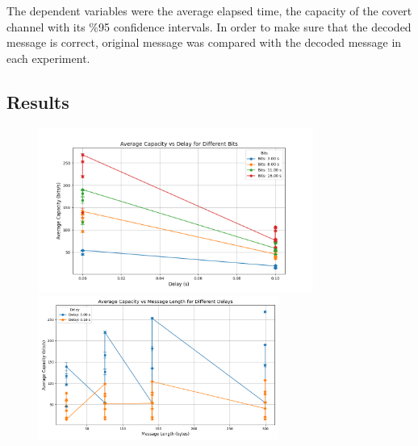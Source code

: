\documentclass[10pt,a4paper]{article}
\begin{document}
The dependent variables were the average elapsed time, the capacity of the covert channel with its \%95 confidence intervals.
In order to make sure that the decoded message is correct, original message was compared with the decoded message in each experiment. 


\subsection*{Results}
\vspace{-2em}
\begin{figure}[H]
\centering
\includegraphics[width=0.8\textwidth]{capacity_vs_delay.png}


\includegraphics[width=0.7\textwidth]{capacity_vs_length.png}

\end{figure}
\end{document}
